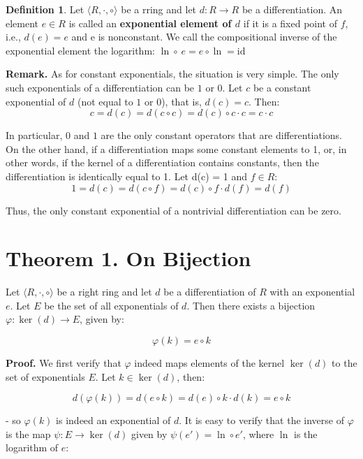 \documentclass[12pt]{article}
\theoremstyle{definition}
\newtheorem{definition}{Definition}[section]
\begin{document}
\vspace{10pt}
\begin{definition} Let $\langle R, \cdot, \circ \rangle$ be a rring and let $d: R \to R$ be a differentiation. 
    An element $e \in R$ is called an \textbf{exponential element of $d$} if it is a 
    fixed point of $f$, i.e., $d(e) = e$ and e is nonconstant. We call the compositional inverse of the 
    exponential element the logarithm: $\ln \circ \ e = e \circ \ln = \mathrm{id}$
\end{definition}

\vspace{10pt}
\noindent\textbf{Remark.} As for constant exponentials, the situation is very simple. 
The only such exponentials of a differentiation can be \(1\) or \(0\). 
Let \(c\) be a constant exponential of \(d\) (not equal to \(1\) or \(0\)), that is, \(d(c) = c\). Then:
\[
c = d(c) = d(c \circ c) = d(c) \circ c \cdot c = c \cdot c
\]

In particular, \(0\) and \(1\) are the only constant operators that are differentiations.
On the other hand, if a differentiation maps some constant elements to 1, or, in other words, 
if the kernel of a differentiation contains constants, then the differentiation is identically equal to 1. 
Let d(c) = 1 and $f \in R$:
\[
1 = d(c) = d(c \circ f) = d(c) \circ f \cdot d(f) =  d(f)
\]

Thus, the only constant exponential of a nontrivial differentiation can be zero.

\vspace{10pt}
\section{Theorem 1. On Bijection}

Let $\langle R, \cdot, \circ \rangle$ be a right ring and let \(d\) be a differentiation of \(R\) with an exponential \(e\). 
Let \(E\) be the set of all exponentials of \(d\). Then there exists a bijection \(\varphi: \ker(d) \to E \), given by:

\[
\varphi(k) = e \circ k
\]

\vspace{10pt}
\textbf{Proof.} We first verify that \(\varphi\) indeed maps elements of the kernel $\ker(d)$ to the set of exponentials $E$.
Let $k \in \ker(d)$, then:

\[
d(\varphi(k)) = d(e \circ k) = d(e) \circ k \cdot d(k) = e \circ k
\]

\newpage
- so $\varphi(k)$ is indeed an exponential of $d$. It is easy to verify that the 
inverse of \(\varphi\) is the map \(\psi: E \to \ker(d)\) given by $\psi(e') = \ln \circ e'$, where \(\ln\) is the logarithm of \(e\):
\end{document}
